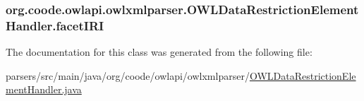 \hypertarget{classorg_1_1coode_1_1owlapi_1_1owlxmlparser_1_1_o_w_l_data_restriction_element_handler_a2d1d189427b02dececeb599dd1c0c25c}{
\subsubsection[{facet\-I\-R\-I}]{ org.\-coode.\-owlapi.\-owlxmlparser.\-O\-W\-L\-Data\-Restriction\-Element\-Handler.\-facet\-I\-R\-I\hspace{0.3cm}{\ttfamily [private]}}}\label{classorg_1_1coode_1_1owlapi_1_1owlxmlparser_1_1_o_w_l_data_restriction_element_handler_a2d1d189427b02dececeb599dd1c0c25c}


The documentation for this class was generated from the following file\-:\begin{DoxyCompactItemize}
\item 
parsers/src/main/java/org/coode/owlapi/owlxmlparser/\hyperlink{_o_w_l_data_restriction_element_handler_8java}{O\-W\-L\-Data\-Restriction\-Element\-Handler.\-java}\end{DoxyCompactItemize}
